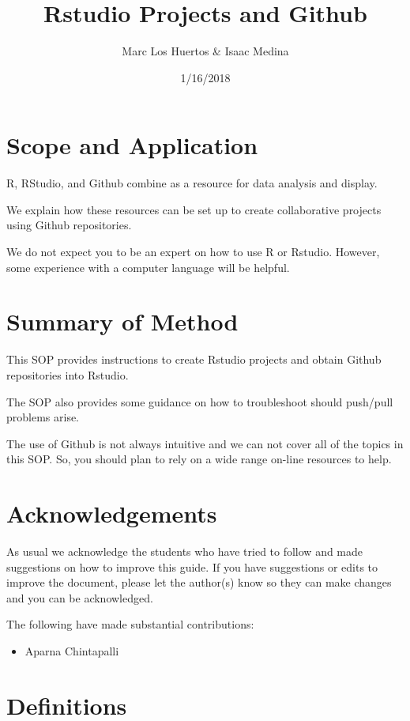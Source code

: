 \documentclass[12pt]{../SOP4_alpha}\usepackage[]{graphicx}\usepackage[]{xcolor}
\author{Marc Los Huertos \& Isaac Medina}
\title{Rstudio Projects and Github}
\date{1/16/2018}
\begin{document}
\maketitle

\section{Scope and Application}

\NP R, RStudio, and Github combine as a resource for data analysis and display.

\NP We explain how these resources can be set up to create collaborative projects using Github repositories. 

\NP We do not expect you to be an expert on how to use R or Rstudio. However, some experience with a computer language will be helpful. 

\section{Summary of Method}

\NP This SOP provides instructions to create Rstudio projects and obtain Github repositories into Rstudio. 

\NP The SOP also provides some guidance on how to troubleshoot should push/pull problems arise.

\NP The use of Github is not always intuitive and we can not cover all of the topics in this SOP. So, you should plan to rely on a wide range on-line resources to help.

\tableofcontents

\newpage

\section{Acknowledgements}

As usual we acknowledge the students who have tried to follow and made suggestions on how to improve this guide. If you have suggestions or edits to improve the document, please let the author(s) know so they can make changes and you can be acknowledged.

The following have made substantial contributions:

\begin{itemize}
\item Aparna Chintapalli
\end{itemize}

\section{Definitions}
\end{document}
